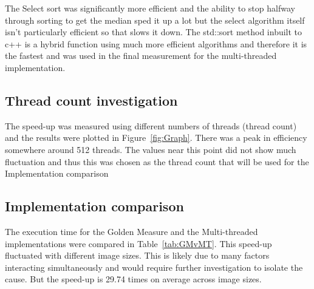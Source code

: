The Select sort was significantly more efficient and the ability to stop halfway through sorting to get the median sped it up a lot but the select algorithm itself isn't particularly efficient so that slows it down.
The std::sort method inbuilt to c++ is a hybrid function using much more efficient algorithms and therefore it is the fastest and was used in the final measurement for the multi-threaded implementation. 

\subsection{Thread count investigation}
The speed-up was measured using different numbers of threads (thread count) and the results were plotted in Figure~\ref{fig:Graph}. There was a peak in efficiency somewhere around 512 threads. The values near this point did not show much fluctuation and thus this was chosen as the thread count that will be used for the Implementation comparison


\subsection{Implementation comparison}

The execution time for the Golden Measure and the Multi-threaded implementations were compared in Table~\ref{tab:GMvMT}. This speed-up fluctuated with different image sizes. This is likely due to many factors interacting simultaneously and would require further investigation to isolate the cause. But the speed-up is 29.74 times on average across image sizes.









